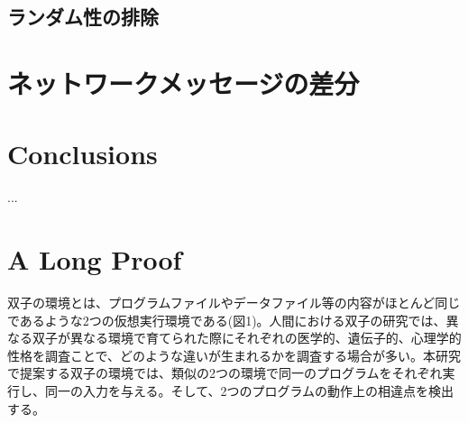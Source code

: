 \documentclass{jreport}
\begin{document}
\section{ランダム性の排除}
\chapter{ネットワークメッセージの差分}
\chapter{Conclusions}
...
\appendix
\chapter{A Long Proof}
双子の環境とは、プログラムファイルやデータファイル等の内容がほとんど同じであるような2つの仮想実行環境である(図1)。人間における双子の研究では、異なる双子が異なる環境で育てられた際にそれぞれの医学的、遺伝子的、心理学的性格を調査ことで、どのような違いが生まれるかを調査する場合が多い。本研究で提案する双子の環境では、類似の2つの環境で同一のプログラムをそれぞれ実行し、同一の入力を与える。そして、2つのプログラムの動作上の相違点を検出する。


\end{document}
